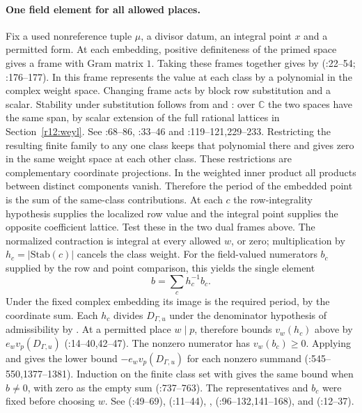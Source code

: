 \paragraph{One field element for all allowed places.}
Fix a used nonreference tuple $\mu$, a divisor datum, an integral point
$x$ and a permitted form. At each embedding, positive definiteness of
the primed space gives a frame with Gram matrix $1$. Taking these frames
together gives  by 
(:22--54;
:176--177).
In this frame  represents the value at each class by
a polynomial in the complex weight space. Changing frame acts by block
row substitution and a scalar. Stability under substitution follows from
 and : over $\mathbb C$ the two
spaces have the same span, by scalar extension of the full rational
lattices in Section~\ref{r12:weyl}. See
:68--86,
:33--46 and
:119--121,229--233.
Restricting the resulting finite family to any one class keeps that
polynomial there and gives zero in the same weight space at each other
class. These restrictions are complementary coordinate projections. In the weighted inner
product all products between distinct components vanish. Therefore
the period of the embedded point is the sum of the same-class
contributions. At each $c$ the row-integrality hypothesis supplies
the localized row value and the integral point supplies the opposite
coefficient lattice. Test these in the two dual frames above. The
normalized contraction is integral at every allowed $w$, or zero;
multiplication by $h_c=|\mathrm{Stab}(c)|$ cancels the class weight.
For the field-valued numerators $b_c$ supplied by the row and point
comparison, this yields the single element
\[
                 b=\sum_c h_c^{-1} b_c .
\]
Under the fixed complex embedding its image is the required period,
by the coordinate sum. Each $h_c$ divides $D_{\Gamma,u}$ under the
denominator hypothesis of admissibility by .
At a permitted place $w\mid p$,  therefore bounds
$v_w(h_c)$ above by $e_w v_p(D_{\Gamma,u})$
(:14--40,42--47). The nonzero numerator has
$v_w(b_c)\ge0$. Applying  and
 gives the lower bound
$-e_w v_p(D_{\Gamma,u})$ for each nonzero summand
(:545--550,1377--1381).
Induction on the finite class set with 
gives the same bound when $b\ne0$, with zero as the empty sum
(:737--763).
The representatives and $b_c$ were fixed before choosing $w$.
See 
(:49--69),
 (:11--44),
, 
(:96--132,141--168),
and 
(:12--37).

